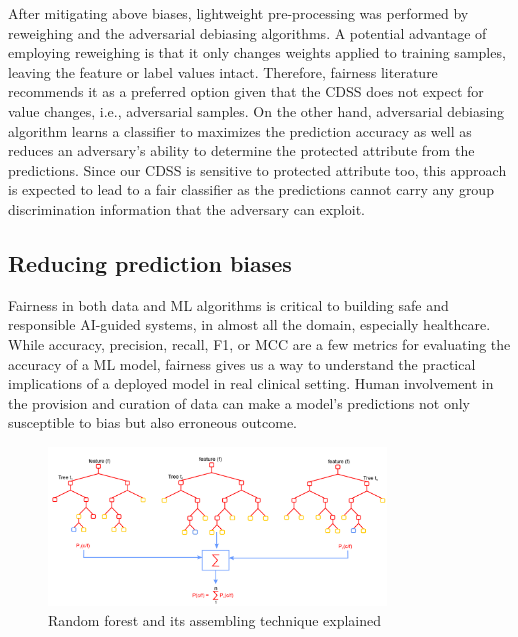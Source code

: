 \hspace*{3.5mm} After mitigating above biases, lightweight pre-processing was performed by reweighing and the adversarial debiasing algorithms. A potential advantage of employing reweighing is that it only changes weights applied to training samples, leaving the feature or label values intact. Therefore, fairness literature recommends it as a preferred option given that the CDSS does not expect for value changes, i.e., adversarial samples. On the other hand, adversarial debiasing algorithm learns a classifier to maximizes the prediction accuracy as well as reduces an adversary's ability to determine the protected attribute from the predictions. Since our CDSS is sensitive to protected attribute too, this approach is expected to lead to a fair classifier as the predictions cannot carry any group discrimination information that the adversary can exploit. 

\subsection{Reducing prediction biases}
Fairness in both data and ML algorithms is critical to building safe and responsible AI-guided systems, in almost all the domain, especially healthcare. While accuracy, precision, recall, F1, or MCC are a few metrics for evaluating the accuracy of a ML model, fairness gives us a way to understand the practical implications of a deployed model in real clinical setting. Human involvement in the provision and curation of data can make a model's predictions not only susceptible to bias but also erroneous outcome. 

\begin{figure}[h]
\centering
	\includegraphics[width=0.8\textwidth]{images/rf_tree.png}
	\caption{Random forest and its assembling technique explained~\cite{karim2018scala}} 
	\label{fig:RF_model}
\end{figure}

